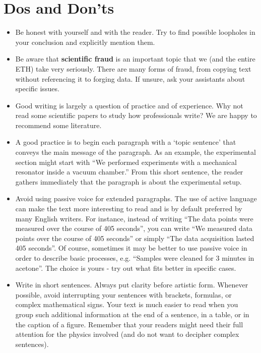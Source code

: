 
\section{Dos and Don'ts}

\begin{itemize}

\item Be honest with yourself and with the reader. Try to find possible loopholes in your conclusion and explicitly mention them.

\item Be aware that \textbf{scientific fraud} is an important topic that we (and the entire ETH) take very seriously. There are many forms of fraud, from copying text without referencing it to forging data. If unsure, ask your assistants about specific issues.

\item Good writing is largely a question of practice and of experience. Why not read some scientific papers to study how professionals write? We are happy to recommend some literature. 

\item A good practice is to begin each paragraph with a `topic sentence' that conveys the main message of the paragraph. As an example, the experimental section might start with ``We performed experiments with a mechanical resonator inside a vacuum chamber.'' From this short sentence, the reader gathers immediately that the paragraph is about the experimental setup.

\item Avoid using passive voice for extended paragraphs. The use of active language can make the text more interesting to read and is by default preferred by many English writers. For instance, instead of writing ``The data points were measured over the course of 405 seconds'', you can write ``We measured data points over the course of 405 seconds'' or simply ``The data acquisition lasted 405 seconds''. Of course, sometimes it may be better to use passive voice in order to describe basic processes, e.g. ``Samples were cleaned for 3 minutes in acetone''. The choice is yours - try out what fits better in specific cases.

\item Write in short sentences. Always put clarity before artistic form. Whenever possible, avoid interrupting your sentences with brackets, formulas, or complex mathematical signs. Your text is much easier to read when you group such additional information at the end of a sentence, in a table, or in the caption of a figure. Remember that your readers might need their full attention for the physics involved (and do not want to decipher complex sentences).


\end{itemize}
